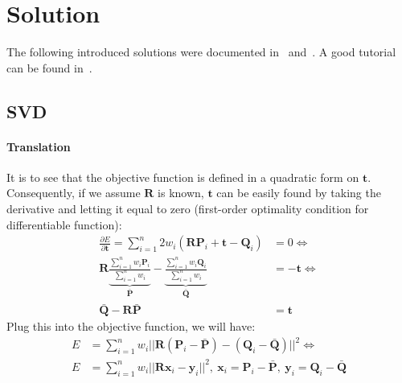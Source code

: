 \documentclass[a4paper]{report}
\begin{document}
\section{Solution}
The following introduced solutions were documented in~\cite{4767965} and~\cite{horn1987closed}. A good tutorial can be found in~\cite{sorkine2017least}.
\subsection{SVD}
\paragraph{Translation} It is to see that the objective function is defined in a quadratic form on $\mathbf{t}$. Consequently, if we assume $\mathbf{R}$ is known, $\mathbf{t}$ can be easily found by taking the derivative and letting it equal to zero (first-order optimality condition for differentiable function):
\begin{align*}
\frac{\partial E}{\partial \mathbf{t}}=\sum_{i=1}^{n} 2w_i(\mathbf{RP}_i+\mathbf{t}-\mathbf{Q}_i)&=0 \Leftrightarrow \\
\mathbf{R}\underbrace{\frac{\sum_{i=1}^{n} w_i\mathbf{P}_i}{\sum_{i=1}^{n} w_i}}_{\bar{\mathbf{P}}} - \underbrace{\frac{\sum_{i=1}^{n} w_i\mathbf{Q}_i}{\sum_{i=1}^{n} w_i}}_{\bar{\mathbf{Q}}} &= -\mathbf{t} \Leftrightarrow \\ 
\bar{\mathbf{Q}}  - \mathbf{R}\bar{\mathbf{P}} &=\mathbf{t}
\end{align*}
Plug this into the objective function, we will have:
\begin{align*}
E &= \sum_{i=1}^{n} w_i||\mathbf{R}(\mathbf{P}_i-\bar{\mathbf{P}})-(\mathbf{Q}_i-\bar{\mathbf{Q}})||^2 \Leftrightarrow \\ 
E &= \sum_{i=1}^{n} w_i||\mathbf{R}\mathbf{x}_i-\mathbf{y}_i||^2,\ \mathbf{x}_i = \mathbf{P}_i-\bar{\mathbf{P}},\ \mathbf{y}_i =\mathbf{Q}_i-\bar{\mathbf{Q}}
\end{align*}
\end{document}
